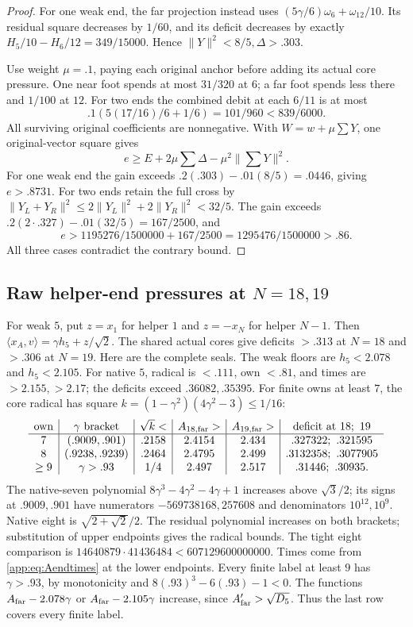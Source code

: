 \documentclass[11pt]{article}
\theoremstyle{definition}
\theoremstyle{remark}
\newcommand{\ip}[2]{\langle #1,#2\rangle}
\newcommand{\norm}[1]{\lVert #1\rVert}
\begin{document}
\begin{proof}
For one weak end, the far projection instead uses
\((5\gamma/6)\omega_6+\omega_{12}/10\).
Its residual square decreases by \(1/60\), and its
deficit decreases by exactly
\(H_5/10-H_6/12=349/15000\).
Hence \(\norm Y^2<8/5,\Delta>.303\).

Use weight \(\mu=.1\), paying each original anchor
before adding its actual core pressure. One near
foot spends at most \(31/320\) at \(6\); a far foot
spends less there and \(1/100\) at \(12\).
For two ends the combined debit at each \(6/11\)
is at most
\[
 .1(5(17/16)/6+1/6)=101/960<839/6000.
\]
All surviving original coefficients are nonnegative.
With \(W=w+\mu\sum Y\), one original-vector square gives
\[
 e\geq E+2\mu\sum\Delta-\mu^2\norm{\sum Y}^2.
\]
For one weak end the gain exceeds
\(.2(.303)-.01(8/5)=.0446\), giving \(e>.8731\).
For two ends retain the full cross by
\(\norm{Y_L+Y_R}^2\leq2\norm{Y_L}^2+2\norm{Y_R}^2<32/5\).
The gain exceeds
\(.2(2\cdot.327)-.01(32/5)=167/2500\),
and
\[
 e>1195276/1500000+167/2500
   =1295476/1500000>.86.
\]
All three cases contradict the contrary bound.
\end{proof}

\subsection{Raw helper-end pressures at \(N=18,19\)}
\label{app:Arawends}
For weak \(5\), put \(z=x_1\) for helper \(1\) and
\(z=-x_N\) for helper \(N-1\). Then
\(\ip{x_A}{v}=\gamma h_5+z/\sqrt2\).
The shared actual cores give deficits
\(>.313\) at \(N=18\) and \(>.306\) at \(N=19\).
Here are the complete seals.
The weak floors are \(h_5<2.078\) and \(h_5<2.105\).
For native \(5\), radical is \(<.111\), own \(<.81\),
and times are \(>2.155,>2.17\); the deficits
exceed \(.36082,.35395\).
For finite owns at least \(7\), the core radical
has square \(k=(1-\gamma^2)(4\gamma^2-3)\leq1/16\):
\[
\begin{array}{c|c|c|c|c|c}
\text{own}&\gamma\text{ bracket}&\sqrt k<&
 A_{18,\rm far}>&A_{19,\rm far}>&
 \text{deficit at }18;\ 19\\ \hline
7&(.9009,.901)&.2158&2.4154&2.434&
 .327322;\ .321595\\
8&(.9238,.9239)&.2464&2.4795&2.499&
 .3132358;\ .3077905\\
\geq9&\gamma>.93&1/4&2.497&2.517&
 .31446;\ .30935.
\end{array}
\]
The native-seven polynomial
\(8\gamma^3-4\gamma^2-4\gamma+1\) increases
above \(\sqrt3/2\); its signs at \(.9009,.901\)
have numerators \(-569738168,257608\) and
denominators \(10^{12},10^9\).
Native eight is \(\sqrt{2+\sqrt2}/2\).
The residual polynomial increases on both brackets;
substitution of upper endpoints gives the radical
bounds. The tight eight comparison is
\(14640879\cdot41436484<607129600000000\).
Times come from \eqref{app:eq:Aendtimes} at the
lower endpoints. Every finite label at least \(9\)
has \(\gamma>.93\), by monotonicity and
\(8(.93)^3-6(.93)-1<0\).
The functions \(A_{\rm far}-2.078\gamma\) or
\(A_{\rm far}-2.105\gamma\) increase, since
\(A_{\rm far}'>\sqrt{D_5}\).
Thus the last row covers every finite label.
\end{document}

